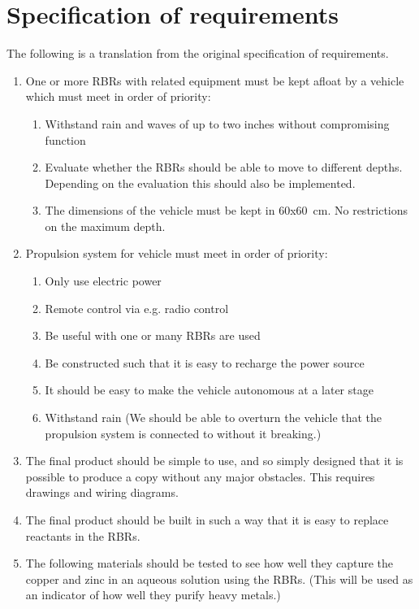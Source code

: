 \clearpage
\section{Specification of requirements}\label{kravspec}
The following is a translation from the original specification of requirements.

\begin{enumerate}    
    \item One or more RBRs with related equipment must be kept afloat by a vehicle which must meet in order of priority:
    \begin{enumerate}
        \item Withstand rain and waves of up to two inches without compromising function
        \item Evaluate whether the RBRs should be able to move to different depths. Depending on the evaluation this should also be implemented.
        \item The dimensions of the vehicle must be kept in 60x60~cm. No restrictions on the maximum depth.
    \end{enumerate}
    \item Propulsion system for vehicle must meet in order of priority:
    \begin{enumerate}
        \item Only use electric power
        \item Remote control via e.g. radio control
        \item Be useful with one or many RBRs are used
        \item Be constructed such that it is easy to recharge the power source
        \item It should be easy to make the vehicle autonomous at a later stage
        \item Withstand rain (We should be able to overturn the vehicle that the propulsion system is connected to without it breaking.)
    \end{enumerate}
    \item The final product should be simple to use, and so simply designed that it is possible to produce a copy without any major obstacles. This requires drawings and wiring diagrams.
    \item The final product should be built in such a way that it is easy to replace reactants in the RBRs.
    \item The following materials should be tested to see how well they capture the copper and zinc in an aqueous solution using the RBRs. (This will be used as an indicator of how well they purify heavy metals.)

\end{enumerate}
